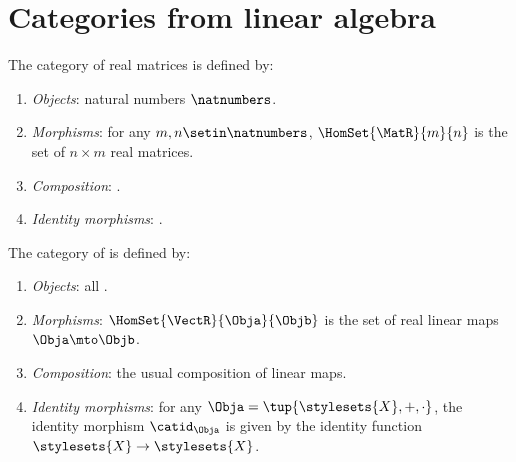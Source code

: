 
\section[Categories from linear algebra]{Categories from linear algebra}
\label{sec:cats-of-linear-algebra}

\begin{ctdefinition}
    \label{def:cat-of-real-matrices}
    The category \MatR of real matrices is defined by:
    \begin{enumerate}
        \item \emph{Objects}: natural numbers $\natnumbers$.
        \item \emph{Morphisms}: for any $m, n \setin \natnumbers$, $\HomSet{\MatR}{m}{n}$ is the set  of $n \times m$ real matrices.
        \item \emph{Composition}: .
        \item \emph{Identity morphisms}: .
    \end{enumerate}
\end{ctdefinition}

\begin{ctdefinition}
    \label{def:cat-of-real-vector-spaces}
    The category \VectR of  is defined by:
    \begin{enumerate}
        \item \emph{Objects}: all .
        \item \emph{Morphisms}: $\HomSet{\VectR}{\Obja}{\Objb}$ is the set of real linear maps $\Obja \mto \Objb$.
        \item \emph{Composition}: the usual composition of linear maps.
        \item \emph{Identity morphisms}: for any  $\Obja = \tup{\stylesets{X}, {{+}},{{ \cdot}}}$, the identity morphism $\catid_\Obja$ is given by the identity function $\stylesets{X} \to \stylesets{X}$.
    \end{enumerate}
\end{ctdefinition}

